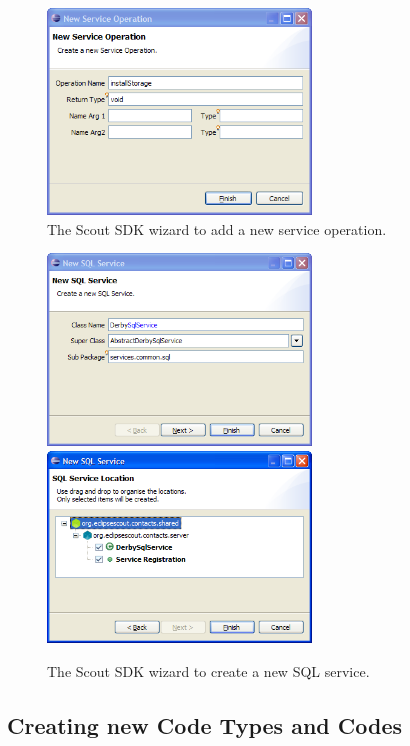 \documentclass[a4paper,10pt,twoside]{book}
\begin{document}
\begin{figure}
\includegraphics[width=7cm]{wizard_service_operation.png}
\caption{The Scout SDK wizard to add a new service operation.}
\end{figure}

\begin{figure}
\includegraphics[width=7cm]{wizard_service_sql_1.png} \hspace{5mm}
\includegraphics[width=7cm]{wizard_service_sql_2.png}
\caption{The Scout SDK wizard to create a new SQL service.}
\end{figure}

\subsection{Creating new Code Types and Codes}
\end{document}
